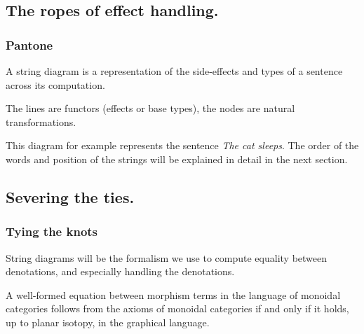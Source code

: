 \documentclass[math, english, info]{beamercours}
\begin{document}
\subsection{The ropes of effect handling.}
\begin{frame}[allowframebreaks]
	\frametitle{Pantone}
	A string diagram is a representation of the side-effects and types of a
	sentence across its computation.

	\smallskip

	The lines are functors (effects or base types), the nodes are natural
	transformations.

	\medskip

	\begin{center}
		\hfill
		\begin{minipage}[c]{.5\textwidth}
		\end{minipage}
		\hfill
		\begin{minipage}[c]{.4\textwidth}
			This diagram for example represents the sentence \textsl{The cat sleeps}.
			The order of the words and position of the strings will be explained in
			detail in the next section.
		\end{minipage}
		\hfill
	\end{center}
\end{frame}

\subsection{Severing the ties.}
\begin{frame}
	\frametitle{Tying the knots}
	String diagrams will be the formalism we use to compute equality between
	denotations, and especially handling the denotations.
	\begin{thm}
		\label{thm:isotopy}
		A well-formed equation between morphism terms in the language of monoidal
		categories follows from the axioms of monoidal categories if and only if it
		holds, up to planar isotopy, in the graphical language.
	\end{thm}
\end{frame}
\end{document}
